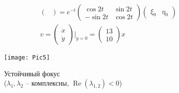 \begin{figure}[!h]
\begin{minipage}[h]{0.49\linewidth}
\begin{gather*}
\begin{pmatrix}
			\end{pmatrix}
			= e^{-t}
			\begin{pmatrix}
				\cos 2t & \sin 2t\\
				-\sin 2t & \cos 2t
			\end{pmatrix}
			\begin{pmatrix}
				\xi_0 & \eta_0
			\end{pmatrix}\\
			v =
			\begin{pmatrix}
				\dot{x} \\ \dot{y}
			\end{pmatrix}
			|_{y = 0} =
			\begin{pmatrix}
				13 \\ 10
			\end{pmatrix}x
		\end{gather*}
	\end{minipage}
	\begin{minipage}[h]{0.49\linewidth}
		\texttt{[image: Pic5]}
		\caption{Устойчивый фокус \\ ($\lambda_1, \lambda_2$ -- комплексны, $\operatorname{Re}\left(\lambda_{1,2}\right) < 0$)}
	\end{minipage}
\end{figure}


